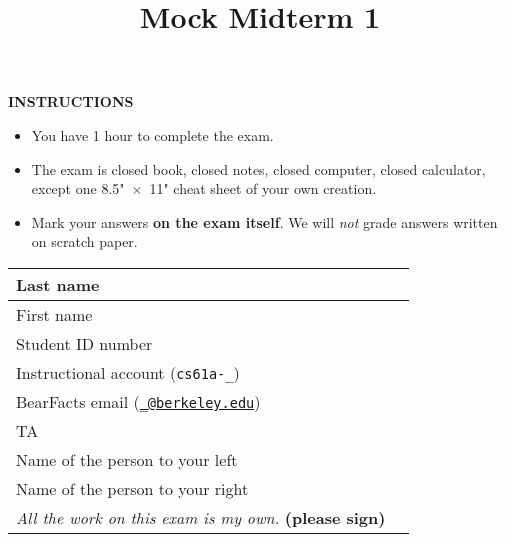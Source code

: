 \documentclass[twoside]{article}
\title{\sc Mock Midterm 1 \solution{Solutions}}
\begin{document}
\thispagestyle{empty}
\maketitle

\medskip

\textbf{INSTRUCTIONS}

\begin{itemize}
\item You have 1 hour to complete the exam.

\item The exam is closed book, closed notes, closed computer, closed calculator,
except one 8.5"~$\times$~11" cheat sheet of your own creation.

\item Mark your answers \textbf{on the exam itself}. We will \emph{not} grade
answers written on scratch paper.
\end{itemize}

\medskip

\begin{center}
\begin{tabular}{|m{5.5cm}|m{8cm}|}
\hline
Last name & \\ [1cm]
\hline
First name & \\ [1cm]
\hline
Student ID number & \\ [1cm]
\hline
Instructional account ({\nolinkurl{cs61a-\_}}) & \\ [1cm]
\hline
BearFacts email (\href{http://berkeley.edu}{\nolinkurl{\_@berkeley.edu}}) & \\ [1cm]
\hline
TA & \\ [1cm]
\hline
Name of the person to your left & \\ [1cm]
\hline
Name of the person to your right & \\ [1cm]
\hline
\emph{All the work on this exam is my own.} \textbf{(please sign)} & \\ [1cm]
\hline
\end{tabular}
\end{center}


\newpage
\begin{enumerate}
    
    \clearpage
    
    \clearpage
    
    \clearpage
    
    
\end{enumerate}
\end{document}

